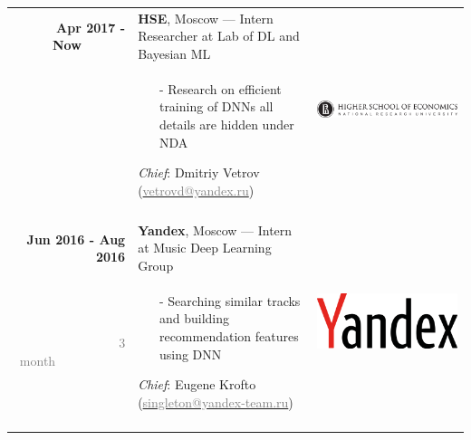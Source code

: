 \documentclass[a4paper,10pt]{article} %
\begin{document}
\begin{tabular}{r|p{11.5cm}c}
\textbf{Apr 2017 - Now~~~~~~} & 
\textbf{HSE}, Moscow --- Intern Researcher  at Lab of DL and Bayesian ML &
\multirow{2}{*}{	\vspace*{+5cm}\includegraphics[scale=0.032]{img/hse}} \\
~~~~~~~~~~~&  
\footnotesize{  \vspace{-0.25cm}
	\begin{itemize}
		\item[-] Research on efficient training of DNNs all details are hidden under NDA
	\end{itemize}
\scriptsize{
	\emph{Chief}: 
	Dmitriy Vetrov
	(\href{mailto:vetrovd@yandex.ru}{\textcolor{gray}{vetrovd@yandex.ru}})}
	\vspace{-0.1cm}} & 
\\
\multicolumn{2}{c}{}\\


\textbf{Jun 2016 - Aug 2016} & 
\textbf{Yandex}, Moscow --- Intern at Music Deep Learning Group &
\multirow{2}{*}{\includegraphics[scale=0.015]{img/yandex}} \\ 
\textcolor{gray}{3 month}~~~~~~~~~~~&  \footnotesize{
  
  \vspace{-0.25cm}
  \begin{itemize}
      \item[-] Searching similar tracks and building recommendation features using DNN
  \end{itemize}
\scriptsize{
	\emph{Chief}:  
	Eugene Krofto
	(\href{mailto:singleton@yandex-team.ru}{\textcolor{gray}{singleton@yandex-team.ru}})}
  \vspace{-0.1cm}
} & 
\\
\multicolumn{2}{c}{}\\


\end{tabular}
\end{document}
